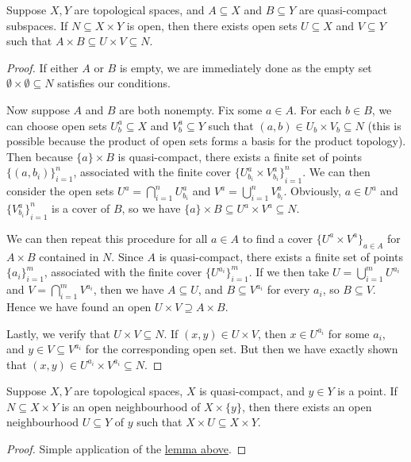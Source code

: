 \begin{lemma}\label{lem:tube}
    Suppose \(X,Y\) are topological spaces,
    and \(A \subseteq X\) and \(B \subseteq Y\) are quasi-compact subspaces.
    If \(N \subseteq X \times Y\) is open,
    then there exists open sets \(U \subseteq X\) and \(V \subseteq Y\)
    such that \(A \times B \subseteq U \times V \subseteq N\).
\end{lemma}
\begin{proof}
    If either \(A\) or \(B\) is empty,
    we are immediately done as the empty set \(\emptyset \times \emptyset \subseteq N\) satisfies our conditions.

    Now suppose \(A\) and \(B\) are both nonempty.
    Fix some \(a \in A\).
    For each \(b \in B\), we can choose open sets \(U_b^a \subseteq X\) and \(V_b^a \subseteq Y\)
    such that \((a,b) \in U_b \times V_b \subseteq N\)
    (this is possible because the product of open sets forms a basis for the product topology).
    Then because \(\{a\} \times B\) is quasi-compact,
    there exists a finite set of points \({\{(a,b_i)\}}_{i=1}^n\),
    associated with the finite cover \({\{U_{b_i}^a \times V_{b_i}^a\}}_{i=1}^n\).
    We can then consider the open sets \(U^a = \bigcap_{i=1}^n U_{b_i}^a\) and \(V^a = \bigcup_{i=1}^n V_{b_i}^a\).
    Obviously, \(a \in U^a\) and \({\{V_{b_i}^a\}}_{i=1}^n\) is a cover of \(B\),
    so we have \(\{a\} \times B \subseteq U^a \times V^a \subseteq N\).

    We can then repeat this procedure for all \(a \in A\)
    to find a cover \({\{U^a \times V^a\}}_{a \in A}\) for \(A \times B\) contained in \(N\).
    Since \(A\) is quasi-compact,
    there exists a finite set of points \({\{a_i\}}_{i=1}^m\),
    associated with the finite cover \({\{U^{a_i}\}}_{i=1}^m\).
    If we then take \(U = \bigcup_{i=1}^m U^{a_i}\) and \(V = \bigcap_{i=1}^m V^{a_i}\),
    then we have \(A \subseteq U\), and \(B \subseteq V^{a_i}\) for every \(a_i\), so \(B \subseteq V\).
    Hence we have found an open \(U \times V \supseteq A \times B\).

    Lastly, we verify that \(U \times V \subseteq N\).
    If \((x,y) \in U \times V\), then \(x \in U^{a_i}\) for some \(a_i\),
    and \(y \in V \subseteq V^{a_i}\) for the corresponding open set.
    But then we have exactly shown that \((x,y) \in U^{a_i} \times V^{a_i} \subseteq N\).
\end{proof}
\begin{corollary}\label{cor:tube}
    Suppose \(X,Y\) are topological spaces,
    \(X\) is quasi-compact, and \(y \in Y\) is a point.
    If \(N \subseteq X \times Y\) is an open neighbourhood of \(X \times \{y\}\),
    then there exists an open neighbourhood \(U \subseteq Y\) of \(y\)
    such that \(X \times U \subseteq X \times Y\).
\end{corollary}
\begin{proof}
    Simple application of the \hyperref[cor:tube]{lemma above}.
\end{proof}


